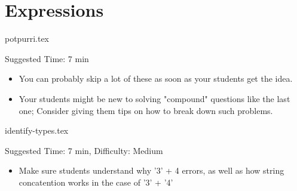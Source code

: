 \documentclass{exam}
\begin{document}
\section{Expressions}
\begin{questions}
    {potpurri.tex}
    \begin{questionmeta}
        Suggested Time: 7 min
        \begin{itemize}
            \item You can probably skip a lot of these as soon as your students get the idea.
            \item Your students might be new to solving "compound" questions like the last one; Consider giving them tips on how to break down such problems.
        \end{itemize}
    \end{questionmeta}

    {identify-types.tex}
    \begin{questionmeta}
        Suggested Time: 7 min, Difficulty: Medium
        \begin{itemize}
            \item Make sure students understand why '3' + 4 errors, as well as how string concatention works in the case of '3' + '4'
        \end{itemize}
    \end{questionmeta}
\end{questions}
\end{document}
